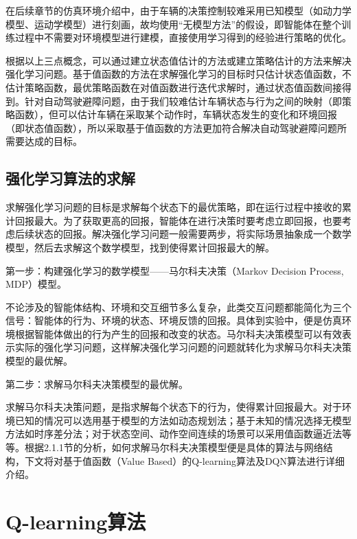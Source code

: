 在后续章节的仿真环境介绍中，由于车辆的决策控制较难采用已知模型（如动力学模型、运动学模型）进行刻画，故均使用“无模型方法”的假设，即智能体在整个训练过程中不需要对环境模型进行建模，直接使用学习得到的经验进行策略的优化。

根据以上三点概念，可以通过建立状态值估计的方法或建立策略估计的方法来解决强化学习问题。基于值函数的方法在求解强化学习的目标时只估计状态值函数，不估计策略函数，最优策略函数在对值函数进行迭代求解时，通过状态值函数间接得到。针对自动驾驶避障问题，由于我们较难估计车辆状态与行为之间的映射（即策略函数），但可以估计车辆在采取某个动作时，车辆状态发生的变化和环境回报（即状态值函数），所以采取基于值函数的方法更加符合解决自动驾驶避障问题所需要达成的目标。

\subsection{强化学习算法的求解} %

求解强化学习问题的目标是求解每个状态下的最优策略，即在运行过程中接收的累计回报最大。为了获取更高的回报，智能体在进行决策时要考虑立即回报，也要考虑后续状态的回报。解决强化学习问题一般需要两步，将实际场景抽象成一个数学模型，然后去求解这个数学模型，找到使得累计回报最大的解。

第一步：构建强化学习的数学模型——马尔科夫决策（Markov Decision Process, MDP）\cite{monahan1982state}模型。

不论涉及的智能体结构、环境和交互细节多么复杂，此类交互问题都能简化为三个信号：智能体的行为、环境的状态、环境反馈的回报。具体到实验中，便是仿真环境根据智能体做出的行为产生的回报和改变的状态。马尔科夫决策模型可以有效表示实际的强化学习问题，这样解决强化学习问题的问题就转化为求解马尔科夫决策模型的最优解。

第二步：求解马尔科夫决策模型的最优解。

求解马尔科夫决策问题，是指求解每个状态下的行为，使得累计回报最大。对于环境已知的情况可以选用基于模型的方法如动态规划法；基于未知的情况选择无模型方法如时序差分法；对于状态空间、动作空间连续的场景可以采用值函数逼近法等等。根据2.1.1节的分析，如何求解马尔科夫决策模型便是具体的算法与网络结构，下文将对基于值函数（Value Based）的Q-learning算法及DQN算法进行详细介绍。

\section{Q-learning算法} %


